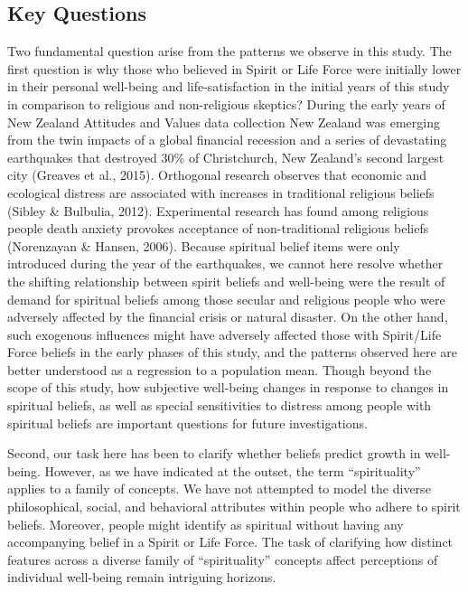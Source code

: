 \documentclass[
  english,
  man,floatsintext]{apa6}
\begin{document}
\hypertarget{key-questions}{%
\subsection{Key Questions}\label{key-questions}}

Two fundamental question arise from the patterns we observe in this study. The first question is why those who believed in Spirit or Life Force were initially lower in their personal well-being and life-satisfaction in the initial years of this study in comparison to religious and non-religious skeptics? During the early years of New Zealand Attitudes and Values data collection New Zealand was emerging from the twin impacts of a global financial recession and a series of devastating earthquakes that destroyed 30\% of Christchurch, New Zealand's second largest city (Greaves et al., 2015). Orthogonal research observes that economic and ecological distress are associated with increases in traditional religious beliefs (Sibley \& Bulbulia, 2012). Experimental research has found among religious people death anxiety provokes acceptance of non-traditional religious beliefs (Norenzayan \& Hansen, 2006). Because spiritual belief items were only introduced during the year of the earthquakes, we cannot here resolve whether the shifting relationship between spirit beliefs and well-being were the result of demand for spiritual beliefs among those secular and religious people who were adversely affected by the financial crisis or natural disaster. On the other hand, such exogenous influences might have adversely affected those with Spirit/Life Force beliefs in the early phases of this study, and the patterns observed here are better understood as a regression to a population mean. Though beyond the scope of this study, how subjective well-being changes in response to changes in spiritual beliefs, as well as special sensitivities to distress among people with spiritual beliefs are important questions for future investigations.

Second, our task here has been to clarify whether beliefs predict growth in well-being. However, as we have indicated at the outset, the term \enquote{spirituality} applies to a family of concepts. We have not attempted to model the diverse philosophical, social, and behavioral attributes within people who adhere to spirit beliefs. Moreover, people might identify as spiritual without having any accompanying belief in a Spirit or Life Force. The task of clarifying how distinct features across a diverse family of \enquote{spirituality} concepts affect perceptions of individual well-being remain intriguing horizons.
\end{document}

